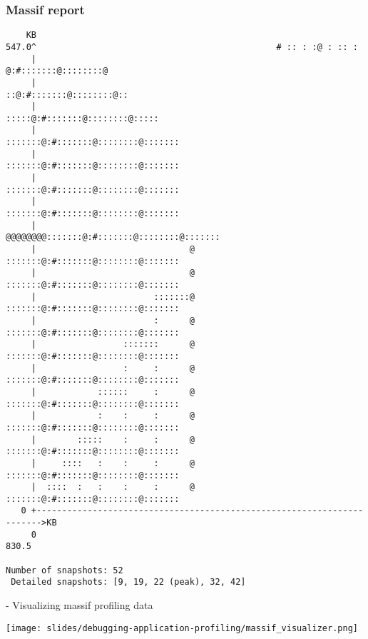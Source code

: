 \begin{frame}[fragile]
  \frametitle{Massif report}
  \begin{block}{}
    \begin{verbatim}
    KB
547.0^                                               # :: : :@ : :: :
     |                                             @:#:::::::@::::::::@
     |                                           ::@:#:::::::@::::::::@::
     |                                        :::::@:#:::::::@::::::::@:::::
     |                                      :::::::@:#:::::::@::::::::@:::::::
     |                                      :::::::@:#:::::::@::::::::@:::::::
     |                                      :::::::@:#:::::::@::::::::@:::::::
     |                                      :::::::@:#:::::::@::::::::@:::::::
     |                              @@@@@@@@:::::::@:#:::::::@::::::::@:::::::
     |                              @       :::::::@:#:::::::@::::::::@:::::::
     |                              @       :::::::@:#:::::::@::::::::@:::::::
     |                       :::::::@       :::::::@:#:::::::@::::::::@:::::::
     |                       :      @       :::::::@:#:::::::@::::::::@:::::::
     |                 :::::::      @       :::::::@:#:::::::@::::::::@:::::::
     |                 :     :      @       :::::::@:#:::::::@::::::::@:::::::
     |            ::::::     :      @       :::::::@:#:::::::@::::::::@:::::::
     |            :    :     :      @       :::::::@:#:::::::@::::::::@:::::::
     |        :::::    :     :      @       :::::::@:#:::::::@::::::::@:::::::
     |     ::::   :    :     :      @       :::::::@:#:::::::@::::::::@:::::::
     |  ::::  :   :    :     :      @       :::::::@:#:::::::@::::::::@:::::::
   0 +----------------------------------------------------------------------->KB
     0                                                                   830.5

Number of snapshots: 52
 Detailed snapshots: [9, 19, 22 (peak), 32, 42]
    \end{verbatim}
  \end{block}
\end{frame}


\begin{frame}{ - Visualizing massif profiling data}
  \begin{center}
    \texttt{[image: slides/debugging-application-profiling/massif\_visualizer.png]}
  \end{center}
\end{frame}

